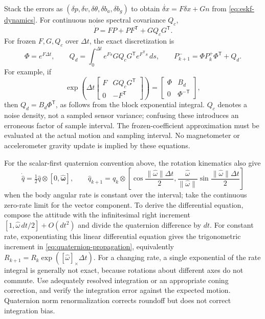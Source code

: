 \documentclass[11pt,a4paper]{article}
\numberwithin{equation}{section}
\begin{document}
Stack the errors as $(\delta p,\delta v,\delta\theta,\delta b_a,
\delta b_g)$ to obtain $\dot{\delta x}=F\delta x+G n$ from
\eqref{eq:eskf-dynamics}. For continuous noise spectral covariance $Q_c$,
\begin{equation}
 \dot P=FP+PF^{\mathsf T}+GQ_cG^{\mathsf T}.
\end{equation}
For frozen $F,G,Q_c$ over $\Delta t$, the exact discretization is
\begin{equation}
 \Phi=e^{F\Delta t},\qquad
 Q_d=\int_0^{\Delta t}e^{Fs}GQ_cG^{\mathsf T}e^{F^{\mathsf T}s}\,ds,
 \qquad P^-_{k+1}=\Phi P^+_k\Phi^{\mathsf T}+Q_d.
\end{equation}
For example, if
\begin{equation}
 \exp\left(\Delta t\begin{bmatrix}F&GQ_cG^{\mathsf T}\\0&-F^{\mathsf T}
                         \end{bmatrix}\right)
 =\begin{bmatrix}\Phi&B_d\\0&\Phi^{-\mathsf T}\end{bmatrix},
\end{equation}
then $Q_d=B_d\Phi^{\mathsf T}$, as follows from the block exponential
integral. $Q_c$ denotes a noise density, not a sampled sensor variance;
confusing these introduces an erroneous factor of sample interval.
The frozen-coefficient approximation must be evaluated at the actual
motion and sampling interval. No magnetometer or accelerometer gravity
update is implied by these equations.

For the scalar-first quaternion convention above, the rotation
kinematics also give
\begin{equation}
 \dot{\widehat q}=\tfrac12\widehat q\otimes
                  [0,\widehat{\boldsymbol\omega}],\qquad
 \widehat q_{k+1}=\widehat q_k\otimes
 \left[\cos\frac{\|\widehat\omega\|\Delta t}{2},
 \frac{\widehat\omega}{\|\widehat\omega\|}
                    \sin\frac{\|\widehat\omega\|\Delta t}{2}\right]
 \label{eq:quaternion-propagation}
\end{equation}
when the body angular rate is constant over the interval; take the
continuous zero-rate limit for the vector component. To derive the
differential equation, compose the attitude with the infinitesimal
right increment $[1,\widehat\omega\,dt/2]+O(dt^2)$ and divide the
quaternion difference by $dt$. For constant rate, exponentiating this
linear differential equation gives the trigonometric increment in
\eqref{eq:quaternion-propagation}, equivalently
$R_{k+1}=R_k\exp([\widehat\omega]_\times\Delta t)$. For a changing
rate, a single exponential of the rate integral is generally not exact,
because rotations about different axes do not commute. Use adequately
resolved integration or an appropriate coning correction, and verify
the integration error against the expected motion. Quaternion norm
renormalization corrects roundoff but does not correct integration bias.
\end{document}

